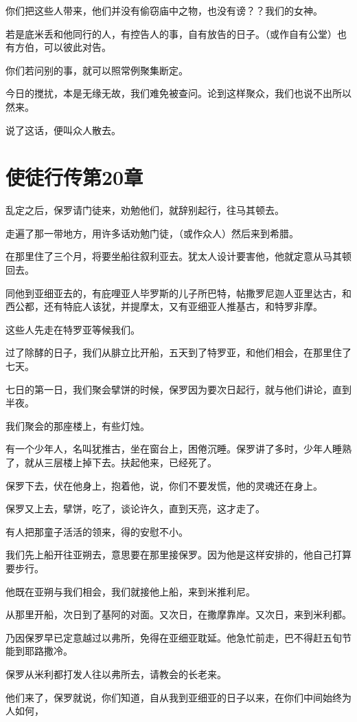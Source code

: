 \documentclass[12pt,oneside]{book}
\begin{document}
你们把这些人带来，他们并没有偷窃庙中之物，也没有谤？？我们的女神。

若是底米丢和他同行的人，有控告人的事，自有放告的日子。（或作自有公堂）也有方伯，可以彼此对告。

你们若问别的事，就可以照常例聚集断定。

今日的搅扰，本是无缘无故，我们难免被查问。论到这样聚众，我们也说不出所以然来。

说了这话，便叫众人散去。

\chapter{使徒行传第20章}
乱定之后，保罗请门徒来，劝勉他们，就辞别起行，往马其顿去。

走遍了那一带地方，用许多话劝勉门徒，（或作众人）然后来到希腊。

在那里住了三个月，将要坐船往叙利亚去。犹太人设计要害他，他就定意从马其顿回去。

同他到亚细亚去的，有庇哩亚人毕罗斯的儿子所巴特，帖撒罗尼迦人亚里达古，和西公都，还有特庇人该犹，并提摩太，又有亚细亚人推基古，和特罗非摩。

这些人先走在特罗亚等候我们。

过了除酵的日子，我们从腓立比开船，五天到了特罗亚，和他们相会，在那里住了七天。

七日的第一日，我们聚会擘饼的时候，保罗因为要次日起行，就与他们讲论，直到半夜。

我们聚会的那座楼上，有些灯烛。

有一个少年人，名叫犹推古，坐在窗台上，困倦沉睡。保罗讲了多时，少年人睡熟了，就从三层楼上掉下去。扶起他来，已经死了。

保罗下去，伏在他身上，抱着他，说，你们不要发慌，他的灵魂还在身上。

保罗又上去，擘饼，吃了，谈论许久，直到天亮，这才走了。

有人把那童子活活的领来，得的安慰不小。

我们先上船开往亚朔去，意思要在那里接保罗。因为他是这样安排的，他自己打算要步行。

他既在亚朔与我们相会，我们就接他上船，来到米推利尼。

从那里开船，次日到了基阿的对面。又次日，在撒摩靠岸。又次日，来到米利都。

乃因保罗早已定意越过以弗所，免得在亚细亚耽延。他急忙前走，巴不得赶五旬节能到耶路撒冷。

保罗从米利都打发人往以弗所去，请教会的长老来。

他们来了，保罗就说，你们知道，自从我到亚细亚的日子以来，在你们中间始终为人如何，
\end{document}
